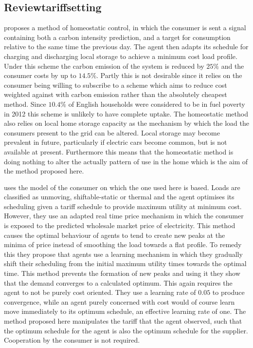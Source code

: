 \documentclass[a4paper, 10 pt, conference]{ieeeconf}  %
\begin{document}
\subsection{Reviewtariffsetting}

\cite{ramchurn2011agenthomeo} proposes a method of homeostatic control, in which the consumer is sent a signal containing both a carbon intensity prediction, and a target for consumption relative to the same time the previous day. The agent then adapts its schedule for charging and discharging local storage to achieve a minimum cost load profile. Under this scheme the carbon emission of the system is reduced by $25\%$ and the consumer costs by up to $14.5\%$. Partly this is not desirable since it relies on the consumer being willing to subscribe to a scheme which aims to reduce cost weighted against with carbon emission rather than the absolutely cheapest method. Since $10.4\%$ of English households were considered to be in fuel poverty in 2012 \cite{govfuelpov} this scheme is unlikely to have complete uptake. The homeostatic method also relies on local home storage capacity as the mechanism by which the load the consumers present to the grid can be altered. Local storage may become prevalent in future, particularly if electric cars become common, but is not available at present. Furthermore this means that the homeostatic method is doing nothing to alter the actually pattern of use in the home which is the aim of the method proposed here.

\cite{ramchurn2011agent} uses the model of the consumer on which the one used here is based. Loads are classified as unmoving, shiftable-static or thermal and the agent optimises its scheduling given a tariff schedule to provide maximum utility at minimum cost. However, they use an adapted real time price mechanism in which the consumer is exposed to the predicted wholesale market price of electricity. This method causes the optimal behaviour of agents to tend to create new peaks at the minima of price instead of smoothing the load towards a flat profile. To remedy this they propose that agents use a learning mechanism in which they gradually shift their scheduling from the initial maximum utility times towards the optimal time. This method prevents the formation of new peaks and using it they show that the demand converges to a calculated optimum. This again requires the agent to not be purely cost oriented. They use a learning rate of $0.05$ to produce convergence, while an agent purely concerned with cost would of course learn move immediately to its optimum schedule, an effective learning rate of one. The method proposed here manipulates the tariff that the agent observed, such that the optimum schedule for the agent is also the optimum schedule for the supplier. Cooperation by the consumer is not required.
\end{document}
